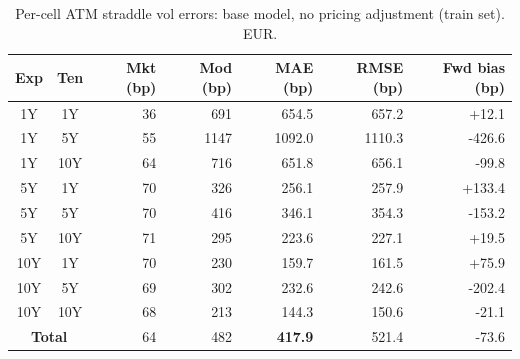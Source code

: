 \begin{table}[H]
\centering
\caption{Per-cell ATM straddle vol errors: base model, no pricing adjustment (train set). EUR.}
\label{tab:base_per_cell_train}
\small
\begin{tabular}{@{}ccrrrrr@{}}
\toprule
\textbf{Exp} & \textbf{Ten} & \textbf{Mkt (bp)} & \textbf{Mod (bp)} & \textbf{MAE (bp)} & \textbf{RMSE (bp)} & \textbf{Fwd bias (bp)} \\
\midrule
  1Y & 1Y & 36 & 691 & 654.5 & 657.2 & +12.1 \\
  1Y & 5Y & 55 & 1147 & 1092.0 & 1110.3 & -426.6 \\
  1Y & 10Y & 64 & 716 & 651.8 & 656.1 & -99.8 \\
  \midrule
  5Y & 1Y & 70 & 326 & 256.1 & 257.9 & +133.4 \\
  5Y & 5Y & 70 & 416 & 346.1 & 354.3 & -153.2 \\
  5Y & 10Y & 71 & 295 & 223.6 & 227.1 & +19.5 \\
  \midrule
  10Y & 1Y & 70 & 230 & 159.7 & 161.5 & +75.9 \\
  10Y & 5Y & 69 & 302 & 232.6 & 242.6 & -202.4 \\
  10Y & 10Y & 68 & 213 & 144.3 & 150.6 & -21.1 \\
\midrule
  \multicolumn{2}{c}{\textbf{Total}} & 64 & 482 & \textbf{417.9} & 521.4 & -73.6 \\
\bottomrule
\end{tabular}
\end{table}